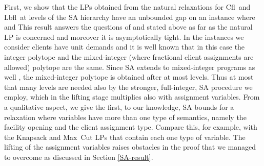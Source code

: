 \documentclass[11pt]{article}
\newcommand{\lbfl}{{\sc Lbfl}}
\newcommand{\cfl}{{\sc Cfl}}
\begin{document}
First, we show that the LPs  obtained from the
natural relaxations for  \cfl\ and \lbfl\ at  levels of the 
SA hierarchy have an unbounded gap on an  instance
where 
  and  
This result answers the questions of \cite{LiS13} and
\cite{AnBS13} stated above as far as the natural LP is concerned 
and moreover it  is asymptotically tight.
In the  instances we consider clients  have unit demands and
it is well known that in this case the integer polytope and the 
mixed-integer (where fractional client assignments are allowed) 
polytope are the same.  Since SA extends to mixed-integer
programs  as well  \cite{Cornuejols08,BalasCC93},  the mixed-integer
polytope is obtained after at most   levels. Thus at most that many
levels are needed  also by the stronger, full-integer, SA procedure we employ,
which in the lifting stage multiplies 
also with assignment variables. 
From a qualitative aspect,   we  give  the first, to our knowledge, SA
bounds for a relaxation where variables have more than one type of
semantics, namely
the facility opening and the client assignment type. 
Compare this, for example, with the Knapsack and Max~Cut LPs that
contain each one type of variable. 
The lifting of the assignment variables 
raises obstacles in the proof that we managed to overcome as discussed
in Section \ref{SA-result}. 
\end{document}
